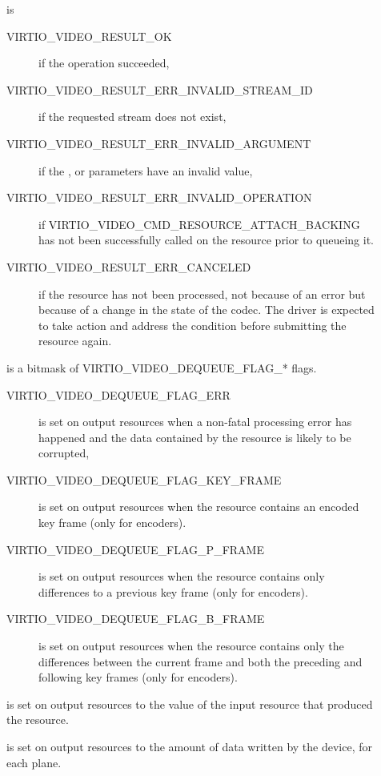 \begin{description}
\item[]
is

\begin{description}
\item[VIRTIO_VIDEO_RESULT_OK]
if the operation succeeded,
\item[VIRTIO_VIDEO_RESULT_ERR_INVALID_STREAM_ID]
if the requested stream does not exist,
\item[VIRTIO_VIDEO_RESULT_ERR_INVALID_ARGUMENT]
if the ,  or 
parameters have an invalid value,
\item[VIRTIO_VIDEO_RESULT_ERR_INVALID_OPERATION]
if VIRTIO_VIDEO_CMD_RESOURCE_ATTACH_BACKING has not been
successfully called on the resource prior to queueing it.
\item[VIRTIO_VIDEO_RESULT_ERR_CANCELED]
if the resource has not been processed, not because of an error but
because of a change in the state of the codec. The driver is expected to
take action and address the condition before submitting the resource
again.
\end{description}
\item[]
is a bitmask of VIRTIO_VIDEO_DEQUEUE_FLAG_* flags.

\begin{description}
\item[VIRTIO_VIDEO_DEQUEUE_FLAG_ERR]
is set on output resources when a non-fatal processing error has
happened and the data contained by the resource is likely to be
corrupted,
\item[VIRTIO_VIDEO_DEQUEUE_FLAG_KEY_FRAME]
is set on output resources when the resource contains an encoded key
frame (only for encoders).
\item[VIRTIO_VIDEO_DEQUEUE_FLAG_P_FRAME]
is set on output resources when the resource contains only differences
to a previous key frame (only for encoders).
\item[VIRTIO_VIDEO_DEQUEUE_FLAG_B_FRAME]
is set on output resources when the resource contains only the
differences between the current frame and both the preceding and
following key frames (only for encoders).
\end{description}
\item[]
is set on output resources to the  value of the input
resource that produced the resource.
\item[]
is set on output resources to the amount of data written by the device,
for each plane.
\end{description}

